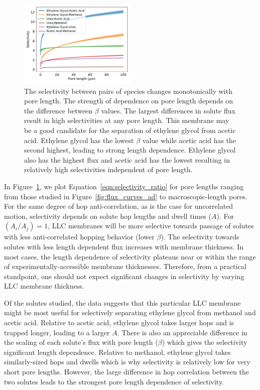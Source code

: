 \documentclass[journal=jctcce,manuscript=article]{achemso}
\begin{document}
  \begin{figure}
  \centering
  \includegraphics[width=0.5\textwidth]{selectivity.pdf}
  \caption{The selectivity between pairs of species changes monotonically with
	  pore length. The strength of dependence on pore length depends on
	  the difference between $\beta$ values. The largest differences in solute
	  flux result in high selectivities at any pore length. This membrane
	  may be a good candidate for the separation of ethylene glycol from
	  acetic acid. Ethylene glycol has the lowest $\beta$ value while
	  acetic acid has the second highest, leading to strong length
	  dependence. Ethylene glycol also has the highest flux and acetic acid
	  has the lowest resulting in relatively high selectivities independent
	  of pore length.}
  \label{fig:selectivity}
  \end{figure}
   
  In Figure~\ref{fig:selectivity}, we plot Equation~\ref{eqn:selectivity_ratio}
  for pore lengths ranging from those studied in
  Figure~\ref{fig:flux_curves_ad} to macroscopic-length pores. For the same
  degree of hop anti-correlation, as is the case for uncorrelated motion,
  selectivity depends on solute hop lengths and dwell times ($A$). For $(A_i /
  A_j)=1$, LLC membranes will be more selective towards passage of solutes with
  less anti-correlated hopping behavior (lower $\beta$). The selectivity
  towards solutes with less length dependent flux increases with membrane
  thickness. In most cases, the length dependence of selectivity plateaus near
  or within the range of experimentally-accessible membrane thicknesses.
  Therefore, from a practical standpoint, one should not expect significant
  changes in selectivity by varying LLC membrane thickness. 
  
  Of the solutes studied, the data suggests that this particular LLC membrane 
  might be most useful for selectively separating ethylene glycol from methanol
  and acetic acid. Relative to acetic acid, ethylene glycol takes larger hops 
  and is trapped longer, leading to a larger $A$. There is also an appreciable 
  difference in the scaling of each solute's flux with pore length ($\beta$) 
  which gives the selectivity significant length dependence. Relative to methanol,
  ethylene glycol takes similarly-sized hops and dwells which is why selectivity
  is relatively low for very short pore lengths. However, the large difference in
  hop correlation between the two solutes leads to the strongest pore length 
  dependence of selectivity. 
  
\end{document}

